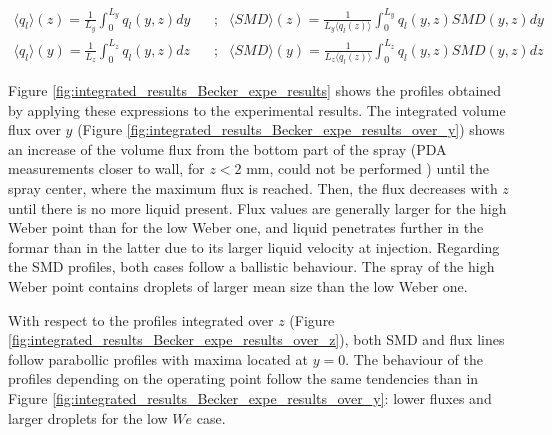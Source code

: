 \begin{subequations}
\label{eq:integrated_results_Becker_expe_results}
\begin{align}
\langle q_l \rangle \left( z \right)  = \frac{1}{L_y} \int_0^{L_y} q_l \left( y, z \right) dy    & ~~~~  ; & \langle SMD \rangle \left( z \right) = \frac{1}{L_y \langle q_l \left( z \right) \rangle} \int_0^{L_y} q_l \left( y, z \right) SMD \left( y, z \right) dy \\
\langle q_l  \rangle \left( y \right) = \frac{1}{L_z} \int_0^{L_z} q_l \left( y, z \right) dz    & ~~~~  ; & \langle SMD \rangle  \left( y \right)  =  \frac{1}{L_z \langle q_l \left( z \right) \rangle} \int_0^{L_z} q_l \left( y, z \right) SMD \left( y, z \right) dz
\end{align}
\end{subequations}


Figure \ref{fig:integrated_results_Becker_expe_results} shows the profiles obtained by applying these expressions to the experimental results. The integrated volume flux over $y$ (Figure \ref{fig:integrated_results_Becker_expe_results_over_y}) shows an increase of the volume flux from the bottom part of the spray (PDA measurements closer to wall, for $z < 2$ mm, could not be performed ) until the spray center, where the maximum flux is reached. Then, the flux decreases with $z$ until there is no more liquid present. Flux values are generally larger for the high Weber point than for the low Weber one, and liquid penetrates further in the formar than in the latter due to its larger liquid velocity at injection. Regarding the SMD profiles, both cases follow a ballistic behaviour. The spray of the high Weber point contains droplets of larger mean size than the low Weber one.

With respect to the profiles integrated over $z$ (Figure \ref{fig:integrated_results_Becker_expe_results_over_z}), both SMD and flux lines follow parabollic profiles with maxima located at $y = 0$. The behaviour of the profiles depending on the operating point follow the same tendencies than in Figure \ref{fig:integrated_results_Becker_expe_results_over_y}: lower fluxes and larger droplets for the low $We$ case.



